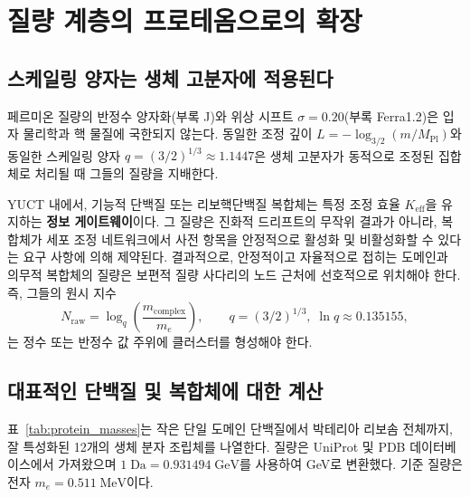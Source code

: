 \documentclass[12pt,a4paper]{article}
\begin{document}
	\section{질량 계층의 프로테옴으로의 확장}
	\label{sec:protein_hierarchy}
	
	\subsection{스케일링 양자는 생체 고분자에 적용된다}
	
	페르미온 질량의 반정수 양자화(부록 J)와 위상 시프트 \(\sigma = 0.20\)(부록 Ferra1.2)은 입자 물리학과 핵 물질에 국한되지 않는다. 동일한 조정 깊이 \(L = -\log_{3/2}(m/M_{\mathrm{Pl}})\)와 동일한 스케일링 양자 \(q = (3/2)^{1/3} \approx 1.1447\)은 생체 고분자가 동적으로 조정된 집합체로 처리될 때 그들의 질량을 지배한다.
	
	YUCT 내에서, 기능적 단백질 또는 리보핵단백질 복합체는 특정 조정 효율 \(K_{\mathrm{eff}}\)을 유지하는 \textbf{정보 게이트웨이}이다. 그 질량은 진화적 드리프트의 무작위 결과가 아니라, 복합체가 세포 조정 네트워크에서 사전 항목을 안정적으로 활성화 및 비활성화할 수 있다는 요구 사항에 의해 제약된다. 결과적으로, 안정적이고 자율적으로 접히는 도메인과 의무적 복합체의 질량은 보편적 질량 사다리의 노드 근처에 선호적으로 위치해야 한다. 즉, 그들의 원시 지수
	\[
	N_{\mathrm{raw}} = \log_q\!\left(\frac{m_{\mathrm{complex}}}{m_e}\right),
	\qquad q = (3/2)^{1/3},\; \ln q \approx 0.135155,
	\]
	는 정수 또는 반정수 값 주위에 클러스터를 형성해야 한다.
	
	\subsection{대표적인 단백질 및 복합체에 대한 계산}
	
	표~\ref{tab:protein_masses}는 작은 단일 도메인 단백질에서 박테리아 리보솜 전체까지, 잘 특성화된 12개의 생체 분자 조립체를 나열한다. 질량은 UniProt 및 PDB 데이터베이스에서 가져왔으며 \(1\;\text{Da} = 0.931494\;\text{GeV}\)를 사용하여 GeV로 변환했다. 기준 질량은 전자 \(m_e = 0.511\;\text{MeV}\)이다.
	
\end{document}
